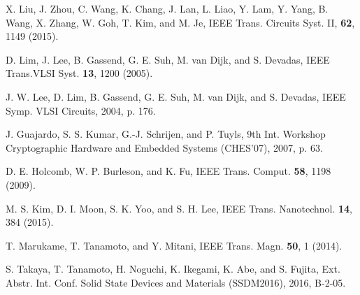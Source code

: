 \documentclass[%
reprint, amsmath,amssymb,%
pra,
]{revtex4-1}
\begin{document}
\begin{thebibliography}{99}
X. Liu, J. Zhou, C. Wang, K. Chang, J. Lan, L. Liao, Y. Lam, Y. Yang, B. Wang, X. Zhang, W. Goh, T. Kim, and M. Je, 
IEEE Trans. Circuits Syst. II, {\bf 62}, 1149 (2015).


D. Lim, J. Lee, B. Gassend, G. E. Suh, M. van Dijk, and S. Devadas, 
IEEE Trans.VLSI Syst. {\bf 13}, 1200 (2005).

J. W. Lee, D. Lim, B. Gassend, G. E. Suh, M. van Dijk, and S. Devadas, 
IEEE Symp. VLSI Circuits, 2004, p. 176.

J. Guajardo, S. S. Kumar, G.-J. Schrijen, and P. Tuyls, 
9th Int. Workshop Cryptographic Hardware and Embedded Systems (CHES'07), 2007, p. 63.

D. E. Holcomb, W. P. Burleson, and K. Fu, 
IEEE Trans. Comput. {\bf 58}, 1198 (2009). 

M. S. Kim, D. I. Moon, S. K. Yoo, and S. H. Lee, 
IEEE Trans. Nanotechnol. {\bf 14}, 384 (2015).

T. Marukame, T. Tanamoto, and Y. Mitani,
IEEE Trans. Magn. {\bf 50},  1 (2014). 

S. Takaya, T. Tanamoto,  H. Noguchi, K. Ikegami, K. Abe, and S. Fujita,
Ext. Abstr. Int. Conf. Solid State Devices and Materials (SSDM2016), 2016, B-2-05.


\end{thebibliography}
\end{document}
